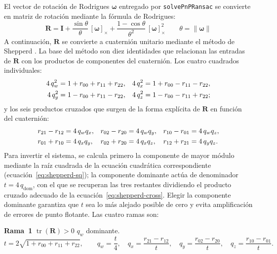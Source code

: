 El vector de rotación de Rodrigues $\boldsymbol{\omega}$ entregado por
\texttt{solvePnPRansac} se convierte en matriz de rotación mediante la
fórmula de Rodrigues:
%
\begin{equation}
  \label{eq:rodrigues}
  \mathbf{R} = \mathbf{I} +
  \frac{\sin\theta}{\theta}\,[\boldsymbol{\omega}]_{\times} +
  \frac{1 - \cos\theta}{\theta^2}\,[\boldsymbol{\omega}]_{\times}^2
  \qquad \theta = \|\boldsymbol{\omega}\|
\end{equation}
%
A continuación, $\mathbf{R}$ se convierte a cuaternión unitario mediante el
método de Shepperd \cite{Shepperd1978}. La base del método son diez
identidades que relacionan las entradas de $\mathbf{R}$ con los productos de
componentes del cuaternión. Los cuatro cuadrados individuales:
%
\begin{align}
  4\,q_w^2 &= 1 + r_{00} + r_{11} + r_{22}, &
  4\,q_x^2 &= 1 + r_{00} - r_{11} - r_{22}, \notag\\
  4\,q_y^2 &= 1 - r_{00} + r_{11} - r_{22}, &
  4\,q_z^2 &= 1 - r_{00} - r_{11} + r_{22};
  \label{eq:shepperd-sq}
\end{align}
%
y los seis productos cruzados que surgen de la forma explícita de
$\mathbf{R}$ en función del cuaternión:
%
\begin{align}
  r_{21} - r_{12} &= 4\,q_w q_x, &
  r_{02} - r_{20} &= 4\,q_w q_y, &
  r_{10} - r_{01} &= 4\,q_w q_z, \notag\\
  r_{01} + r_{10} &= 4\,q_x q_y, &
  r_{02} + r_{20} &= 4\,q_x q_z, &
  r_{12} + r_{21} &= 4\,q_y q_z.
  \label{eq:shepperd-cross}
\end{align}
%
Para invertir el sistema, se calcula primero la componente de mayor módulo
mediante la raíz cuadrada de la ecuación cuadrática correspondiente
(ecuación~\ref{eq:shepperd-sq}); la componente dominante actúa de denominador
$t = 4\,q_{\text{dom}}$, con el que se recuperan las tres restantes dividiendo
el producto cruzado adecuado de la ecuación~\ref{eq:shepperd-cross}. Elegir
la componente dominante garantiza que $t$ sea lo más alejado posible de cero
y evita amplificación de errores de punto flotante. Las cuatro ramas son:

\medskip
\noindent\textbf{Rama~1} \quad $\operatorname{tr}(\mathbf{R}) > 0$
\quad\textrightarrow\quad $q_w$ dominante.
\begin{equation}
  \label{eq:shepperd-b1}
  t = 2\sqrt{1+r_{00}+r_{11}+r_{22}}, \qquad
  q_w = \frac{t}{4}, \quad
  q_x = \frac{r_{21}-r_{12}}{t}, \quad
  q_y = \frac{r_{02}-r_{20}}{t}, \quad
  q_z = \frac{r_{10}-r_{01}}{t}.
\end{equation}

